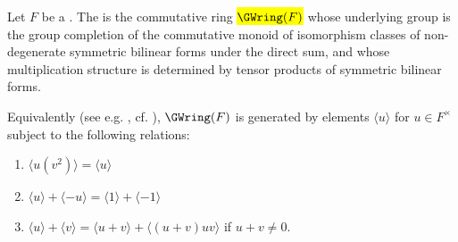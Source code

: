 \begin{definition} \label{definition:grothendieck_witt_group_of_a_field}
Let $F$ be a . The  is the commutative ring \hl{$\GWring(F)$} whose underlying group is the group completion of the commutative monoid of isomorphism classes of non-degenerate symmetric bilinear forms under the direct sum, and whose multiplication structure is determined by tensor products of symmetric bilinear forms.

Equivalently (see e.g. \cite[Chapter IV Lemma 1.1]{husemoller_milnor}, cf. \cite[Lemma 3.9]{morel_a1at}), $\GWring(F)$ is generated by elements $\langle u \rangle$ for $u \in F^\times$ subject to the following relations:
\begin{enumerate}
    \item $\langle u(v^2) \rangle = \langle u \rangle$
    \item $\langle u \rangle + \langle -u \rangle  =  \langle 1 \rangle + \langle -1 \rangle$
    \item $\langle u \rangle + \langle v \rangle = \langle u + v  \rangle + \langle (u+v)uv \rangle$ if $u+v \neq 0$.
\end{enumerate}
\end{definition}